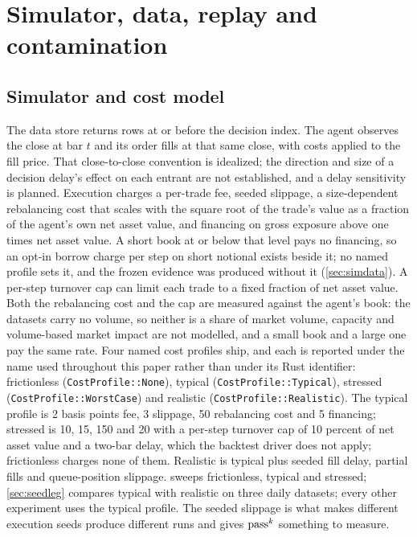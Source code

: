 \section{Simulator, data, replay and contamination}\label{app:simdata}

\subsection{Simulator and cost model}

The data store returns rows at or before the decision index. The agent observes the close at bar $t$ and its order fills at that same close, with costs applied to the fill price. That close-to-close convention is idealized; the direction and size of a decision delay's effect on each entrant are not established, and a delay sensitivity is planned. Execution charges a per-trade fee, seeded slippage, a size-dependent rebalancing cost that scales with the square root of the trade's value as a fraction of the agent's own net asset value, and financing on gross exposure above one times net asset value. A short book at or below that level pays no financing, so an opt-in borrow charge per step on short notional exists beside it; no named profile sets it, and the frozen evidence was produced without it (\cref{sec:simdata}). A per-step turnover cap can limit each trade to a fixed fraction of net asset value. Both the rebalancing cost and the cap are measured against the agent's book: the datasets carry no volume, so neither is a share of market volume, capacity and volume-based market impact are not modelled, and a small book and a large one pay the same rate. Four named cost profiles ship, and each is reported under the name used throughout this paper rather than under its Rust identifier: frictionless (\texttt{CostProfile::None}), typical (\texttt{CostProfile::Typical}), stressed (\texttt{CostProfile::WorstCase}) and realistic (\texttt{CostProfile::Realistic}). The typical profile is 2 basis points fee, 3 slippage, 50 rebalancing cost and 5 financing; stressed is 10, 15, 150 and 20 with a per-step turnover cap of 10 percent of net asset value and a two-bar delay, which the backtest driver does not apply; frictionless charges none of them. Realistic is typical plus seeded fill delay, partial fills and queue-position slippage.  sweeps frictionless, typical and stressed; \cref{sec:seedleg} compares typical with realistic on three daily datasets; every other experiment uses the typical profile. The seeded slippage is what makes different execution seeds produce different runs and gives $\text{pass}^{k}$ something to measure.

